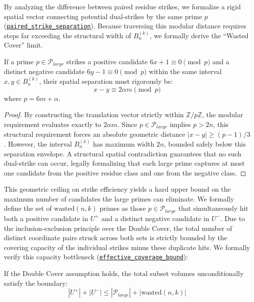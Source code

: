 \documentclass[lean]{AFM}
\renewcommand{\.}{\hskip .75pt}
\def\urlpfx{https://github.com/ElNando888/KrafftSieve/blob/main}
\begin{document}
By analyzing the difference between paired residue strikes, we formalize a rigid spatial vector
connecting potential dual-strikes by the same prime $p$
(\href{\urlpfx/Legendre/GeometricTranslation.lean#L105}{\texttt{paired\_strike\_separation}}).
Because traversing this modular distance requires steps far exceeding the structural width of
$B_n^{(k)}$, we formally derive the ``Wasted Cover'' limit.

\begin{lemma}
If a prime $p \in \mathcal{P}_{large}$ strikes a positive candidate $6x+1 \equiv 0 \pmod{p}$ and a
distinct negative candidate $6y-1 \equiv 0 \pmod{p}$ within the same interval $x, y \in B_n^{(k)}$,
their spatial separation must rigorously be:
$$ x - y \equiv 2\alpha m \pmod{p} $$
where $p = 6m + \alpha$.
\end{lemma}
\begin{proof}
By constructing the translation vector strictly within $\mathbb{Z}/p\mathbb{Z}$, the modular
requirement evaluates exactly to $2\alpha m$. Since $p \in \mathcal{P}_{large}$ implies $p > 2n$,
this structural requirement forces an absolute geometric distance $|x - y| \ge (p-1)/3$. However,
the interval $B_n^{(k)}$ has maximum width $2n$, bounded safely below this separation envelope.
A structural spatial contradiction guarantees that no such dual-strike can occur, legally
formalizing that each large prime captures at most one candidate from the positive residue class
and one from the negative class.
\end{proof}

This geometric ceiling on strike efficiency yields a hard upper bound on the maximum number of
candidates the large primes can eliminate. We formally define the set of $\text{wasted}(n,k)$
primes as those $p \in \mathcal{P}_{large}$ that simultaneously hit both a positive candidate in
$U^+$ and a distinct negative candidate in $U^-$. Due to the inclusion-exclusion principle over the
Double Cover, the total number of distinct coordinate pairs struck across both sets is strictly
bounded by the covering capacity of the individual strikes minus these duplicate hits. We formally
verify this capacity bottleneck (\href{\urlpfx/Legendre/CardinalityContradiction.lean}
{\texttt{effective\_coverage\_bound}}):

\begin{theorem}
If the Double Cover assumption holds, the total subset volumes unconditionally satisfy the
boundary:
$$ |U^+| + |U^-| \leq |\mathcal{P}_{large}| + |\text{wasted}(n,k)| $$
\end{theorem}
\end{document}
